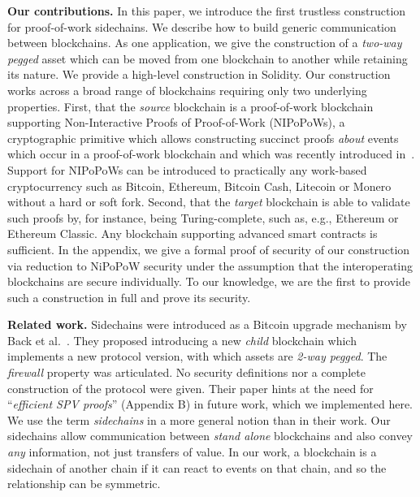 \noindent\textbf{Our contributions. } In this paper, we introduce the first
trustless construction for proof-of-work sidechains. We describe how to build
generic communication between blockchains. As one application, we give the
construction of a \emph{two-way pegged} asset which can be moved from one
blockchain to another while retaining its nature. We provide a high-level
construction in Solidity. Our construction works across a broad range of
blockchains requiring only two underlying properties. First, that the
\emph{source} blockchain is a proof-of-work blockchain supporting
Non-Interactive Proofs of Proof-of-Work (NIPoPoWs), a cryptographic primitive
which allows constructing succinct proofs \emph{about} events which occur in a
proof-of-work blockchain and which was recently introduced in~\cite{nipopows}.
Support for NIPoPoWs can be introduced to practically any
work-based cryptocurrency such as Bitcoin, Ethereum, Bitcoin Cash, Litecoin or
Monero without a hard or soft fork. Second, that the \emph{target} blockchain is
able to validate such proofs by, for instance, being Turing-complete, such as,
e.g., Ethereum or Ethereum Classic. Any blockchain supporting advanced smart
contracts is sufficient. In the appendix, we give a formal proof of security of
our construction via reduction to NiPoPoW security under the assumption that the
interoperating blockchains are secure individually. To our knowledge, we are the
first to provide such a construction in full and prove its security.

\noindent\textbf{Related work. }
Sidechains were introduced as a Bitcoin upgrade mechanism by Back et
al.~\cite{sidechains}. They proposed introducing a new \emph{child} blockchain
which implements a new protocol version, with which assets are \emph{2-way
pegged}. The \emph{firewall} property was articulated. No security definitions
nor a complete construction of the protocol were given. Their paper hints at the
need for ``\emph{efficient SPV proofs}'' (Appendix B) in future work, which we
implemented here. We use the term \emph{sidechains} in a more general notion
than in their work. Our sidechains allow communication between \emph{stand
alone} blockchains and also convey \emph{any} information, not just transfers of
value. In our work, a blockchain is a sidechain of another chain if it can react
to events on that chain, and so the relationship can be symmetric.

